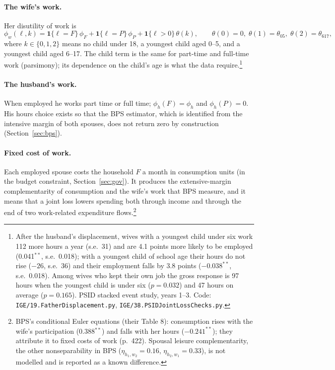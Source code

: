 \documentclass[11pt]{article}
\newcommand{\code}[1]{\texttt{#1}}
\newcommand{\1}{\mathbf{1}}
\begin{document}
\paragraph{The wife's work.} Her disutility of work is
\[
  \phi_w(\ell, k) = \1\{\ell = F\}\,\phi_F + \1\{\ell = P\}\,\phi_P + \1\{\ell > 0\}\,\theta(k),
  \qquad \theta(0) = 0,\; \theta(1) = \theta_{05},\; \theta(2) = \theta_{617},
\]
where $k \in \{0, 1, 2\}$ means no child under 18, a youngest child aged 0--5, and a youngest child aged 6--17. The
child term is the same for part-time and full-time work (parsimony); its dependence on the child's age is what the
data require.\footnote{After the husband's displacement, wives with a youngest child under six work 112 more hours a
year (s.e.\ 31) and are 4.1 points more likely to be employed (0.041$^{**}$, s.e.\ 0.018); with a youngest child of
school age their hours do not rise ($-26$, s.e.\ 36) and their employment falls by 3.8 points ($-0.038^{**}$, s.e.\
0.018). Among wives who kept their own job the gross response is 97 hours when the youngest child is under six
($p=0.032$) and 47 hours on average ($p=0.165$). PSID stacked event study, years 1--3. Code:
\code{IGE/19.FatherDisplacement.py}, \code{IGE/38.PSIDJointLossChecks.py}.}

\paragraph{The husband's work.} When employed he works part time or full time; $\phi_h(F) = \phi_h$ and $\phi_h(P) = 0$.
His hours choice exists so that the BPS estimator, which is identified from the intensive margin of both spouses, does
not return zero by construction (Section~\ref{sec:bps}).

\paragraph{Fixed cost of work.} Each employed spouse costs the household $F$ a month in consumption units (in the budget
constraint, Section~\ref{sec:gov}). It produces the extensive-margin complementarity of consumption and the wife's work
that BPS measure, and it means that a joint loss lowers spending both through income and through the end of two
work-related expenditure flows.\footnote{BPS's conditional Euler equations (their Table 8): consumption rises with the
wife's participation (0.388$^{**}$) and falls with her hours ($-0.241^{**}$); they attribute it to fixed costs of work
(p.~422). Spousal leisure complementarity, the other nonseparability in BPS ($\eta_{h_1,w_2} = 0.16$,
$\eta_{h_2,w_1} = 0.33$), is not modelled and is reported as a known difference.}
\end{document}
